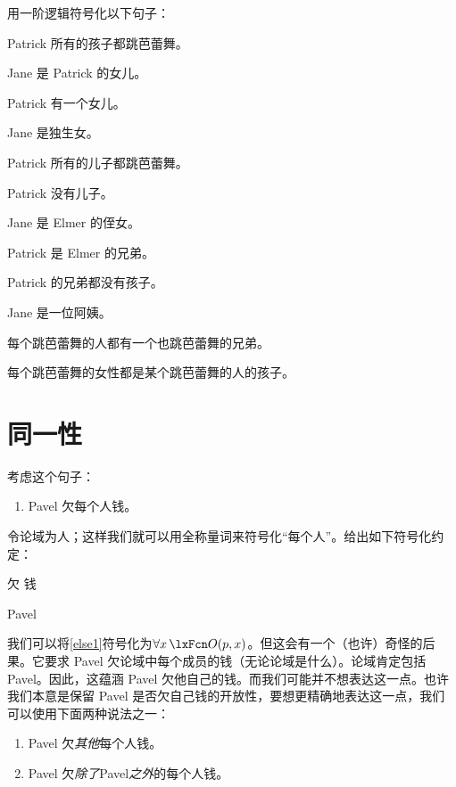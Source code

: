 用一阶逻辑符号化以下句子：


\begin{compactlist}
\item Patrick 所有的孩子都跳芭蕾舞。
\item Jane 是 Patrick 的女儿。
\item Patrick 有一个女儿。
\item Jane 是独生女。
\item Patrick 所有的儿子都跳芭蕾舞。
\item Patrick 没有儿子。
\item Jane 是 Elmer 的侄女。
\item Patrick 是 Elmer 的兄弟。
\item Patrick 的兄弟都没有孩子。
\item Jane 是一位阿姨。
\item 每个跳芭蕾舞的人都有一个也跳芭蕾舞的兄弟。
\item 每个跳芭蕾舞的女性都是某个跳芭蕾舞的人的孩子。
\end{compactlist}

\chapter{同一性}
\label{sec.identity}

考虑这个句子：


\begin{enumerate}
\item\label{else1} Pavel 欠每个人钱。
\end{enumerate}


令论域为人；这样我们就可以用全称量词来符号化“每个人”。给出如下符号化约定：


\begin{ekey}
		\item[\atom{O}{x,y}]  欠  钱
		\item[p] Pavel
	\end{ekey}

我们可以将\cref*{else1}符号化为$\forall x\, \atom{O}{p,x}$。但这会有一个（也许）奇怪的后果。它要求 Pavel 欠论域中每个成员的钱（无论论域是什么）。论域肯定包括 Pavel。因此，这蕴涵 Pavel 欠他自己的钱。而我们可能并不想表达这一点。也许我们本意是保留 Pavel 是否欠自己钱的开放性，要想更精确地表达这一点，我们可以使用下面两种说法之一：

\begin{enumerate}
		\item\label{else1b} Pavel 欠\emph{其他}每个人钱。
		\item\label{else1c} Pavel 欠\emph{除了}Pavel\emph{之外}的每个人钱。
	\end{enumerate}

